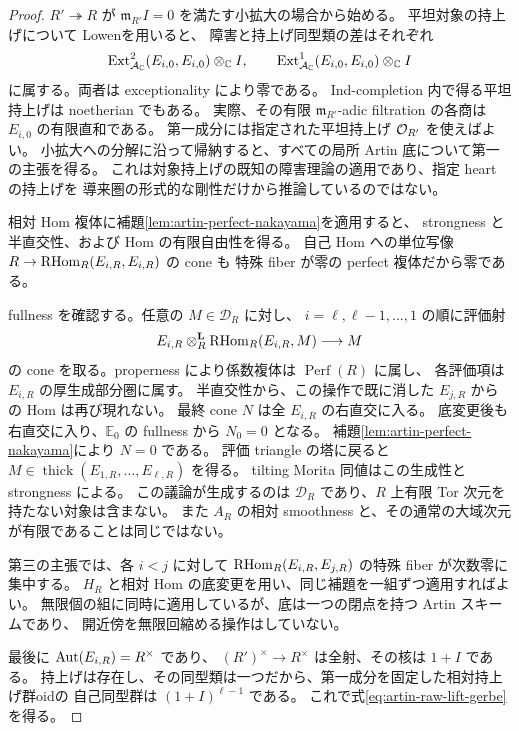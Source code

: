 \begin{proof}
$R'\twoheadrightarrow R$ が $\mathfrak m_{R'}I=0$ を満たす小拡大の場合から始める。
平坦対象の持上げについて Lowen\cite[Theorem A の平坦対象への双対形]{Lowen}を用いると、
障害と持上げ同型類の差はそれぞれ
\[
 \operatorname{Ext}^2_{\mathcal A_{\mathbb C}}(E_{i,0},E_{i,0})\otimes_\mathbb C I,
 \qquad
 \operatorname{Ext}^1_{\mathcal A_{\mathbb C}}(E_{i,0},E_{i,0})\otimes_\mathbb C I
\]
に属する。両者は exceptionality により零である。
Ind-completion 内で得る平坦持上げは noetherian でもある。
実際、その有限 $\mathfrak m_{R'}$-adic filtration の各商は
$E_{i,0}$ の有限直和である。
第一成分には指定された平坦持上げ $\mathcal O_{R'}$ を使えばよい。
小拡大への分解に沿って帰納すると、すべての局所 Artin 底について第一の主張を得る。
これは対象持上げの既知の障害理論の適用であり、指定 heart の持上げを
導来圏の形式的な剛性だけから推論しているのではない。

相対 Hom 複体に補題\ref{lem:artin-perfect-nakayama}を適用すると、
strongness と半直交性、および Hom の有限自由性を得る。
自己 Hom への単位写像 $R\to\operatorname{RHom}_R(E_{i,R},E_{i,R})$ の cone も
特殊 fiber が零の perfect 複体だから零である。

fullness を確認する。任意の $M\in\mathcal D_R$ に対し、
$i=\ell,\ell-1,\ldots,1$ の順に評価射
\[
 E_{i,R}\otimes_R^{\mathbf L}\operatorname{RHom}_R(E_{i,R},M)\longrightarrow M
\]
の cone を取る。properness により係数複体は $\operatorname{Perf}(R)$ に属し、
各評価項は $E_{i,R}$ の厚生成部分圏に属す。
半直交性から、この操作で既に消した $E_{j,R}$ からの Hom は再び現れない。
最終 cone $N$ は全 $E_{i,R}$ の右直交に入る。
底変更後も右直交に入り、$\mathbb E_0$ の fullness から $N_0=0$ となる。
補題\ref{lem:artin-perfect-nakayama}により $N=0$ である。
評価 triangle の塔に戻ると $M\in\operatorname{thick}(E_{1,R},\ldots,E_{\ell,R})$ を得る。
tilting Morita 同値はこの生成性と strongness による。
この議論が生成するのは $\mathcal D_R$ であり、$R$ 上有限 Tor 次元を持たない対象は含まない。
また $A_R$ の相対 smoothness と、その通常の大域次元が有限であることは同じではない。

第三の主張では、各 $i<j$ に対して
$\operatorname{RHom}_R(E_{i,R},E_{j,R})$ の特殊 fiber が次数零に集中する。
$H_R$ と相対 Hom の底変更を用い、同じ補題を一組ずつ適用すればよい。
無限個の組に同時に適用しているが、底は一つの閉点を持つ Artin スキームであり、
開近傍を無限回縮める操作はしていない。

最後に $\operatorname{Aut}(E_{i,R})=R^\times$ であり、
$(R')^\times\to R^\times$ は全射、その核は $1+I$ である。
持上げは存在し、その同型類は一つだから、第一成分を固定した相対持上げ群oidの
自己同型群は $(1+I)^{\ell-1}$ である。
これで式\eqref{eq:artin-raw-lift-gerbe}を得る。
\end{proof}

